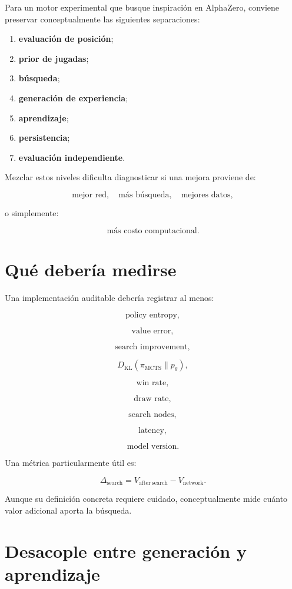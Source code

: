 \documentclass[11pt,a4paper]{article}
\newcommand{\KL}{D_{\mathrm{KL}}}
\begin{document}
Para un motor experimental que busque inspiración en AlphaZero, conviene preservar conceptualmente las siguientes separaciones:

\begin{enumerate}
    \item \textbf{evaluación de posición};
    \item \textbf{prior de jugadas};
    \item \textbf{búsqueda};
    \item \textbf{generación de experiencia};
    \item \textbf{aprendizaje};
    \item \textbf{persistencia};
    \item \textbf{evaluación independiente}.
\end{enumerate}

Mezclar estos niveles dificulta diagnosticar si una mejora proviene de:

\[
\text{mejor red},
\quad
\text{más búsqueda},
\quad
\text{mejores datos},
\]

o simplemente:

\[
\text{más costo computacional}.
\]

\section{Qué debería medirse}

Una implementación auditable debería registrar al menos:

\[
\text{policy entropy},
\]

\[
\text{value error},
\]

\[
\text{search improvement},
\]

\[
\KL(\pi_{\mathrm{MCTS}}\parallel p_\theta),
\]

\[
\text{win rate},
\]

\[
\text{draw rate},
\]

\[
\text{search nodes},
\]

\[
\text{latency},
\]

\[
\text{model version}.
\]

Una métrica particularmente útil es:

\[
\Delta_{\mathrm{search}}
=
V_{\mathrm{after\ search}}
-
V_{\mathrm{network}}.
\]

Aunque su definición concreta requiere cuidado, conceptualmente mide cuánto valor adicional aporta la búsqueda.

\section{Desacople entre generación y aprendizaje}
\end{document}
